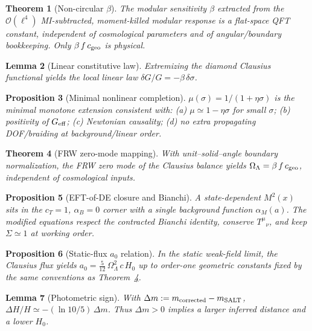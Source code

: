 \documentclass[aps,prd,preprint,onecolumn,longbibliography,nofootinbib]{revtex4-2}
\theoremstyle{plain}
\newtheorem{theorem}{Theorem}
\newtheorem{proposition}[theorem]{Proposition}
\newtheorem{lemma}[theorem]{Lemma}
\theoremstyle{remark}
\newcommand{\OmL}{\Omega_\Lambda}
\newcommand{\Hzero}{H_0}
\newcommand{\alM}{\alpha_{\!M}}
\newcommand{\alB}{\alpha_{\!B}}
\newcommand{\be}{\beta}
\newcommand{\order}[1]{\mathcal{O}\!\left(#1\right)}
\newcommand{\Sig}{\Sigma} %
\newcommand{\Geff}{G_{\rm eff}}
\begin{document}
\begin{theorem}[Non-circular $\be$]\label{thm:beta-noncircular}
The modular sensitivity $\be$ extracted from the $\order{\ell^4}$ MI-subtracted, moment-killed modular response is a flat-space QFT constant, independent of cosmological parameters and of angular/boundary bookkeeping. Only $\be\,f\,c_{\rm geo}$ is physical.
\end{theorem}

\begin{lemma}[Linear constitutive law]\label{lem:deltaG}
Extremizing the diamond Clausius functional yields the local linear law $\delta G/G=-\be\,\delta\sigma$.
\end{lemma}

\begin{proposition}[Minimal nonlinear completion]\label{prop:pade}
$\mu(\sigma)=1/(1+\eta\sigma)$ is the minimal monotone extension consistent with: (a) $\mu\simeq 1-\eta\sigma$ for small $\sigma$; (b) positivity of $\Geff$; (c) Newtonian causality; (d) no extra propagating DOF/braiding at background/linear order.
\end{proposition}

\begin{theorem}[FRW zero-mode mapping]\label{thm:Omegalambda}
With unit–solid–angle boundary normalization, the FRW zero mode of the Clausius balance yields $\OmL=\be\,f\,c_{\rm geo}$, independent of cosmological inputs.
\end{theorem}

\begin{proposition}[EFT-of-DE closure and Bianchi]\label{prop:eft-bianchi}
A state-dependent $M^2(x)$ sits in the $c_T\!=\!1$, $\alB\!=\!0$ corner with a single background function $\alM(a)$. The modified equations respect the contracted Bianchi identity, conserve $T^\mu{}_\nu$, and keep $\Sig\simeq 1$ at working order.
\end{proposition}

\begin{proposition}[Static-flux $a_0$ relation]\label{prop:a0}
In the static weak-field limit, the Clausius flux yields $a_0 = \frac{5}{12}\,\OmL^2\,c\,\Hzero$ up to order-one geometric constants fixed by the same conventions as Theorem~\ref{thm:Omegalambda}.
\end{proposition}

\begin{lemma}[Photometric sign]\label{lem:photometric-sign}
With $\Delta m := m_{\rm corrected}-m_{\rm SALT}$, $\Delta H/H \simeq -(\ln 10/5)\,\Delta m$. Thus $\Delta m>0$ implies a larger inferred distance and a lower $\Hzero$.
\end{lemma}
\end{document}
